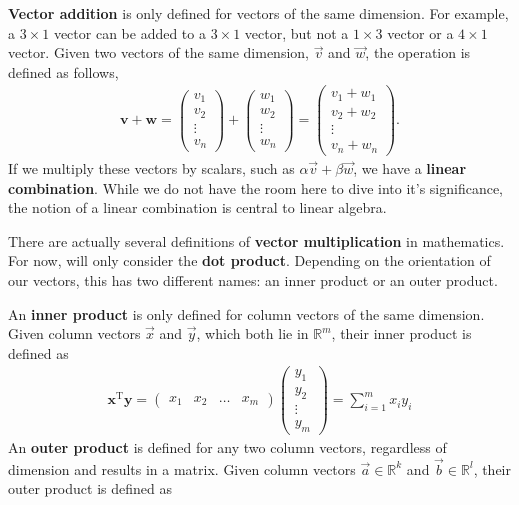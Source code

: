 \documentclass[11pt]{article} %
\begin{document}
\textbf{Vector addition} is only defined for vectors of the same dimension. For example, a $3 \times 1$ vector can be added to a $3 \times 1$ vector, but not a $1 \times 3$ vector or a $4 \times 1$ vector. Given two vectors of the same dimension, $\Vec{v}$ and $\Vec{w}$, the operation is defined as follows,
\begin{align}
    \textbf{v}+\textbf{w}=
    \begin{pmatrix}
        v_1 \\
        v_2 \\
        \vdots \\
        v_n
    \end{pmatrix}+
    \begin{pmatrix}
        w_1 \\
        w_2 \\
        \vdots \\
        w_n
    \end{pmatrix}=
    \begin{pmatrix}
        v_1+w_1 \\
        v_2+w_2 \\
        \vdots \\
        v_n+w_n
    \end{pmatrix}. \nonumber
\end{align}
If we multiply these vectors by scalars, such as $\alpha \Vec{v}+ \beta \Vec{w}$, we have a \textbf{linear combination}. While we do not have the room here to dive into it's significance, the notion of a linear combination is central to linear algebra.

There are actually several definitions of \textbf{vector multiplication} in mathematics. For now, will only consider the \textbf{dot product}. Depending on the orientation of our vectors, this has two different names:  an inner product or an outer product. 

An \textbf{inner product} is only defined for column vectors of the same dimension. Given column vectors $\Vec{x}$ and $\Vec{y}$, which both lie in $\mathbb{R}^m$, their inner product is defined as
\begin{align}
    \textbf{x}^\text{T}\textbf{y}=
    \begin{pmatrix}
        x_1 & x_2 & \hdots & x_m
    \end{pmatrix}
    \begin{pmatrix}
        y_1 \\
        y_2 \\
        \vdots \\
        y_m
    \end{pmatrix}
    =\sum_{i=1}^{m}{x_i y_i}
    \nonumber
\end{align}
An \textbf{outer product} is defined for any two column vectors, regardless of dimension and results in a matrix. Given column vectors $\Vec{a}\in \mathbb{R}^k$ and $\Vec{b}\in \mathbb{R}^l$, their outer product is defined as
\end{document}
